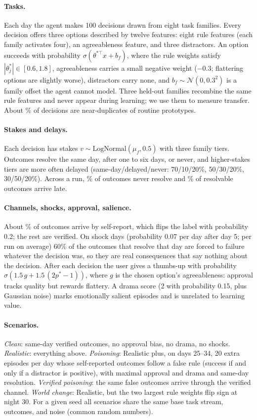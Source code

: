 \documentclass[11pt]{article}
\begin{document}
\paragraph{Tasks.} Each day the agent makes 100 decisions drawn from eight task families. Every decision offers three options described by twelve features: eight rule features (each family activates four), an agreeableness feature, and three distractors. An option succeeds with probability $\sigma(\theta^{\ast\top}x+b_f)$, where the rule weights satisfy $|\theta^\ast_j|\in[0.6,1.8]$, agreeableness carries a small negative weight ($-0.3$; flattering options are slightly worse), distractors carry none, and $b_f\sim\mathcal N(0,0.3^2)$ is a family offset the agent cannot model. Three held-out families recombine the same rule features and never appear during learning; we use them to measure transfer. About \% of decisions are near-duplicates of routine prototypes.

\paragraph{Stakes and delays.} Each decision has stakes $v\sim\text{LogNormal}(\mu_f,0.5)$ with three family tiers. Outcomes resolve the same day, after one to six days, or never, and higher-stakes tiers are more often delayed (same-day/delayed/never: 70/10/20\%, 50/30/20\%, 30/50/20\%). Across a run, \% of outcomes never resolve and \% of resolvable outcomes arrive late.

\paragraph{Channels, shocks, approval, salience.} About \% of outcomes arrive by self-report, which flips the label with probability 0.2; the rest are verified. On shock days (probability 0.07 per day after day 5;  per run on average) 60\% of the outcomes that resolve that day are forced to failure whatever the decision was, so they are real consequences that say nothing about the decision. After each decision the user gives a thumbs-up with probability $\sigma(1.5\,g+1.5\,(2p^\ast-1))$, where $g$ is the chosen option's agreeableness: approval tracks quality but rewards flattery. A drama score (2 with probability 0.15, plus Gaussian noise) marks emotionally salient episodes and is unrelated to learning value.

\paragraph{Scenarios.} \emph{Clean}: same-day verified outcomes, no approval bias, no drama, no shocks. \emph{Realistic}: everything above. \emph{Poisoning}: Realistic plus, on days 25--34, 20 extra episodes per day whose self-reported outcomes follow a false rule (success if and only if a distractor is positive), with maximal approval and drama and same-day resolution. \emph{Verified poisoning}: the same false outcomes arrive through the verified channel. \emph{World change}: Realistic, but the two largest rule weights flip sign at night 30. For a given seed all scenarios share the same base task stream, outcomes, and noise (common random numbers).
\end{document}
